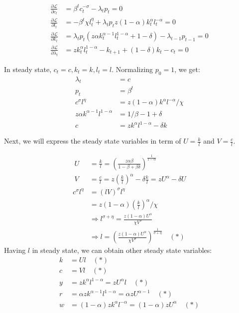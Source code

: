 \documentclass[12pt,a4paper]{article}
\begin{document}
  \begin{equation}
    \begin{split} 
    \frac{\partial \mathcal{L}}{\partial c_t} &=\beta^tc_t^{-\sigma}-\lambda_t p_t=0\\
    \frac{\partial \mathcal{L}}{\partial l_t} &=-\beta^t\chi l_t^{\eta}+\lambda_t p_tz(1-\alpha) k_t^{\alpha}l_t^{-\alpha}=0\\
    \frac{\partial \mathcal{L}}{\partial k_t}&=\lambda_t p_t(z\alpha k_t^{\alpha -1}l_t^{1-\alpha}+1-\delta)-\lambda_{t-1}p_{t-1}=0\\
    \frac{\partial \mathcal{L}}{\partial \lambda_t} &= zk_t^{\alpha}l_t^{1-\alpha}-k_{t+1}+(1-\delta)k_t - c_t = 0
    \end{split}
    \end{equation}
    
  In steady state, $c_t =c, k_t =k, l_t =l$. Normalizing  $p_0=1$, we get:
 \begin{equation}
    \begin{split}
    \lambda_t &= c\\
    p_t &= \beta^t\\
    c^{\sigma} l^{\eta}&= z(1-\alpha)k^{\alpha}l^{-\alpha}/\chi\\
    z\alpha k^{\alpha -1}l^{1-\alpha}&= 1/\beta -1 +\delta\\
    c&=zk^{\alpha}l^{1-\alpha}-\delta k
    \end{split}
    \end{equation}
 
Next, we will express the steady state variables in term of $U=\frac{k}{l}$ and $V=\frac{c}{l}$.

  \begin{equation}
    \begin{split}
    \: U &= \frac{k}{l}=\left(\frac{z\alpha \beta}{1-\beta +\beta \delta}\right)^{\frac{1}{1-\alpha}} \\
   \: V &=\frac{c}{l}=z(\frac{k}{l})^{\alpha}-\delta \frac{k}{l}=zU^{\alpha}-\delta U \\
    c^{\sigma} l^{\eta} &= (lV)^{\sigma}l^{\eta}\\
    &= z(1-\alpha)(\frac{k}{l})^{\alpha}/\chi\\
    &\Rightarrow l^{\sigma+\eta} =\frac{z(1-\alpha)U^{\alpha}}{\chi V^{\sigma}}\\ &\Rightarrow l=\left(\frac{z(1-\alpha)U^{\alpha}}{\chi V^{\sigma}}\right)^{\frac{1}{\sigma+\eta}} \quad (*)
    \end{split}
    \end{equation}
Having $l$ in steady state, we can obtain other steady state variables:
  \begin{equation}
    \begin{split}
    k&=Ul\quad (*)\\
    c&=Vl\quad (*)\\
    y&=zk^{\alpha}l^{1-\alpha}=zU^{\alpha}l\quad (*)\\
    r&=\alpha zk^{\alpha-1}l^{1-\alpha}=\alpha zU^{\alpha -1}\quad (*)\\
    w&=(1-\alpha)zk^{\alpha}l^{-\alpha}=(1-\alpha)zU^{\alpha} \quad (*)
    \end{split}
    \end{equation}
    
\end{document}
